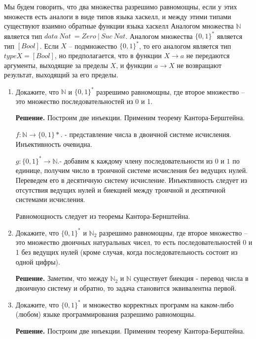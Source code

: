 \def\doubleunderline#1{\underline{\underline{#1}}}

Мы будем говорить, что два множества разрешимо равномощны, если у этих множеств есть аналоги в виде типов языка хаскелл,
    и между этими типами существуют взаимно обратные функции языка хаскелл
Аналогом множества $\mathbb{N}$ является тип $data\ Nat\ = Zero\ |\ Suc\ Nat$.
Аналогом множества $\{0,1\}^*$ является тип $[Bool]$.
Если $X$ -- подмножество $\{0,1\}^*$, то его аналогом является тип $type X = [Bool]$, но предполагается,
    что в функции $X \to a$ не передаются аргументы, выходящие за пределы $X$, и функции $a \to X$ не возвращают результат, выходящий за его пределы.

\begin{enumerate}

\item Докажите, что $\mathbb{N}$ и $\{0,1\}^*$ разрешимо равномощны, где второе множество -- это множество последовательностей из 0 и 1.

\textbf{Решение.} Построим две инъекции. Применим теорему Кантора-Берштейна. 

$f:\mathbb{N} \rightarrow \{0, 1\}*$. - представление числа в двоичной системе исчисления. Инъективность очевидна.

$g:\{0,1\}^* \rightarrow \mathbb{N}$.- добавим к каждому члену последовательности из $0$ и $1$ 
по единице, получим число в троичной системе исчисления без ведущих нулей. Переведем его в 
десятичную систему исчисление. Инъективность следует из отсутствия ведущих нулей и биекцией 
между троичной и десятичной системами исчисления. 

Равномощность следует из теоремы Кантора-Бернштейна.

\item Докажите, что $\{0,1\}^*$ и $\mathbb{N}_2$ разрешимо равномощны, где второе множество -- 
это множество двоичных натуральных чисел,
    то есть последовательностей 0 и 1 без ведущих нулей (кроме случая, когда 
    последовательность состоит из одной цифры).
    
\textbf{Решение.} Заметим, что между $\mathbb{N}_2$ и $\mathbb{N}$ существует биекция - 
перевод числа в двоичную систему и обратно, то задача становится эквивалентна первой.   

\item Докажите, что $\{0,1\}^*$ и множество корректных программ на каком-либо (любом) языке 
программирования разрешимо равномощны.

\textbf{Решение.} Построим две инъекции. Применим теорему Кантора-Берштейна. 


\end{enumerate}
